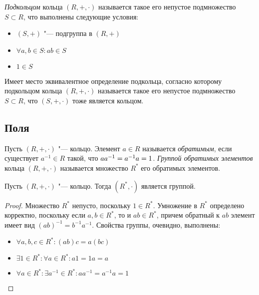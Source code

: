 \begin{definition}
	\textit{Подкольцом} кольца $(R, +, \cdot)$ называется такое его непустое подмножество $S \subset R$, что выполнены следующие условия:
	\begin{itemize}
		\item $(S, +)$ "--- подгруппа в $(R, +)$
		\item $\forall a, b \in S: ab \in S$
		\item $1 \in S$
	\end{itemize}
\end{definition}

\begin{note}
	Имеет место эквивалентное определение подкольца, согласно которому подкольцом кольца $(R, +, \cdot)$ называется такое его непустое подмножество $S \subset R$, что $(S, +, \cdot)$ тоже является кольцом.
\end{note}

\subsection{Поля}

\begin{definition}
	Пусть $(R, +, \cdot)$ "--- кольцо. Элемент $a \in R$ называется \textit{обратимым}, если существует $a^{-1} \in R$ такой, что $aa^{-1} \hm{=} a^{-1}a = 1$. \textit{Группой обратимых элементов} кольца $(R, +, \cdot)$ называется множество $R^*$ его обратимых элементов.
\end{definition}

\begin{proposition}
	Пусть $(R, +, \cdot)$ "--- кольцо. Тогда $(R^*, \cdot)$ является группой.
\end{proposition}

\begin{proof}
	Множество $R^*$ непусто, поскольку $1 \in R^*$. Умножение в $R^*$ определено корректно, поскольку если $a, b \in R^*$, то и $ab \in R^*$, причем обратный к $ab$ элемент имеет вид $(ab)^{-1} = b^{-1}a^{-1}$. Свойства группы, очевидно, выполнены:
	\begin{itemize}
		\item $\forall a, b, c \in R^*: (ab)c = a(bc)$
		\item $\exists 1 \in R^*: \forall a \in R^*: a1 = 1a = a$
		\item $\forall a \in R^*: \exists a^{-1} \in R^*: aa^{-1} = a^{-1}a = 1$\qedhere
	\end{itemize}
\end{proof}


